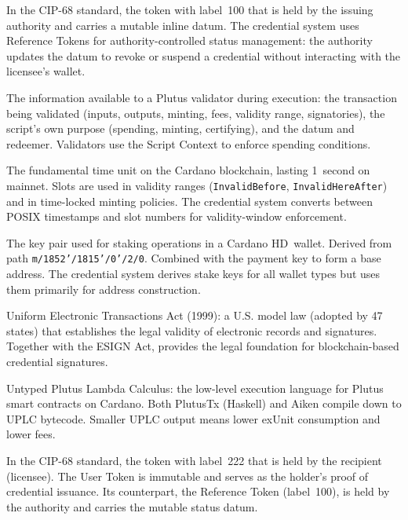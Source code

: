 \begin{description}[style=nextline, leftmargin=2.5cm, labelwidth=2.3cm]
\item[Reference Token]
  In the CIP-68 standard, the token with label~100 that is held by the
  issuing authority and carries a mutable inline datum.  The credential
  system uses Reference Tokens for authority-controlled status management:
  the authority updates the datum to revoke or suspend a credential without
  interacting with the licensee's wallet.

\item[Script Context]
  The information available to a Plutus validator during execution: the
  transaction being validated (inputs, outputs, minting, fees, validity
  range, signatories), the script's own purpose (spending, minting,
  certifying), and the datum and redeemer.  Validators use the Script Context
  to enforce spending conditions.

\item[Slot]
  The fundamental time unit on the Cardano blockchain, lasting 1~second on
  mainnet.  Slots are used in validity ranges (\texttt{InvalidBefore},
  \texttt{InvalidHereAfter}) and in time-locked minting policies.  The
  credential system converts between POSIX timestamps and slot numbers for
  validity-window enforcement.

\item[Stake Key]
  The key pair used for staking operations in a Cardano HD~wallet.  Derived
  from path \texttt{m/1852'/1815'/0'/2/0}.  Combined with the payment key to
  form a base address.  The credential system derives stake keys for all
  wallet types but uses them primarily for address construction.

\item[UETA]
  Uniform Electronic Transactions Act (1999): a U.S. model law (adopted by
  47 states) that establishes the legal validity of electronic records and
  signatures.  Together with the ESIGN Act, provides the legal foundation
  for blockchain-based credential signatures.

\item[UPLC]
  Untyped Plutus Lambda Calculus: the low-level execution language for
  Plutus smart contracts on Cardano.  Both PlutusTx (Haskell) and Aiken
  compile down to UPLC bytecode.  Smaller UPLC output means lower exUnit
  consumption and lower fees.

\item[User Token]
  In the CIP-68 standard, the token with label~222 that is held by the
  recipient (licensee).  The User Token is immutable and serves as the
  holder's proof of credential issuance.  Its counterpart, the Reference
  Token (label~100), is held by the authority and carries the mutable status
  datum.


\end{description}
